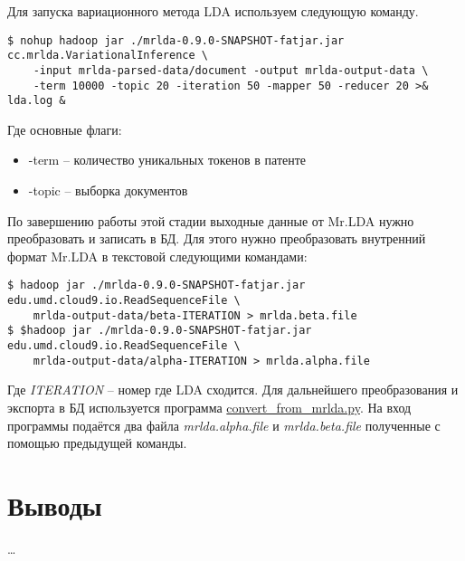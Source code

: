 Для запуска вариационного метода LDA используем следующую команду. 
\begin{lstlisting}
$ nohup hadoop jar ./mrlda-0.9.0-SNAPSHOT-fatjar.jar cc.mrlda.VariationalInference \
    -input mrlda-parsed-data/document -output mrlda-output-data \
    -term 10000 -topic 20 -iteration 50 -mapper 50 -reducer 20 >& lda.log &
\end{lstlisting}

Где основные флаги:
\begin{itemize}
    \item -term -- количество уникальных токенов в патенте
    \item -topic -- выборка документов
\end{itemize}

По завершению работы этой стадии выходные данные от Mr.LDA нужно преобразовать и записать в БД. Для этого нужно преобразовать внутренний формат Mr.LDA в 
текстовой следующими командами:

\begin{lstlisting}
$ hadoop jar ./mrlda-0.9.0-SNAPSHOT-fatjar.jar edu.umd.cloud9.io.ReadSequenceFile \
    mrlda-output-data/beta-ITERATION > mrlda.beta.file
$ $hadoop jar ./mrlda-0.9.0-SNAPSHOT-fatjar.jar edu.umd.cloud9.io.ReadSequenceFile \
    mrlda-output-data/alpha-ITERATION > mrlda.alpha.file
\end{lstlisting}

Где \emph{ITERATION} -- номер где LDA сходится. Для дальнейшего преобразования и экспорта в БД используется программа 
\href{https://github.com/SemPatent/Golubev/blob/master/convert_from_mrlda.py}{convert\_from\_mrlda.py}. На вход программы подаётся два файла 
\emph{mrlda.alpha.file} и \emph{mrlda.beta.file} полученные с помощью предыдущей команды.

\section{Выводы}
\ldots

\newpage


